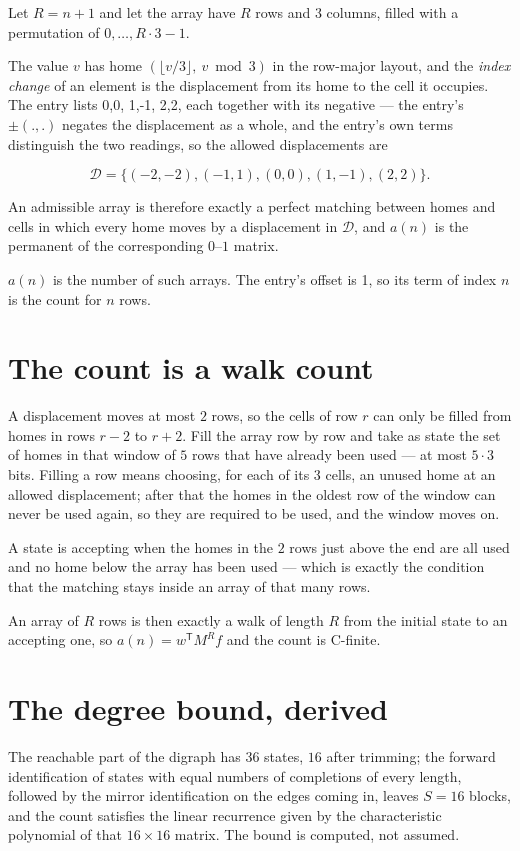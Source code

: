 \documentclass[11pt]{article}
\theoremstyle{definition}
\begin{document}
Let $R = n + 1$ and let the array have $R$ rows and $3$ columns, filled with a permutation of $0,\dots,R\cdot3-1$.

The value $v$ has home $(\lfloor v/3\rfloor,\ v \bmod 3)$ in the row-major layout, and the {\itshape index change} of an element is the displacement from its home to the cell it occupies. The entry lists 0,0, 1,-1, 2,2, each together with its negative --- the entry's $\pm(.,.)$ negates the displacement as a whole, and the entry's own terms distinguish the two readings, so the allowed displacements are

\[\mathcal{D} = \{(-2,-2), (-1,1), (0,0), (1,-1), (2,2)\}.\]

An admissible array is therefore exactly a perfect matching between homes and cells in which every home moves by a displacement in $\mathcal{D}$, and $a(n)$ is the permanent of the corresponding $0$--$1$ matrix.

$a(n)$ is the number of such arrays. The entry's offset is 1, so its term of index $n$ is the count for $n$ rows.

\section{The count is a walk count}

A displacement moves at most $2$ rows, so the cells of row $r$ can only be filled from homes in rows $r-2$ to $r+2$. Fill the array row by row and take as state the set of homes in that window of $5$ rows that have already been used --- at most $5\cdot3$ bits. Filling a row means choosing, for each of its $3$ cells, an unused home at an allowed displacement; after that the homes in the oldest row of the window can never be used again, so they are required to be used, and the window moves on.

A state is accepting when the homes in the $2$ rows just above the end are all used and no home below the array has been used --- which is exactly the condition that the matching stays inside an array of that many rows.

An array of $R$ rows is then exactly a walk of length $R$ from the initial state to an accepting one, so $a(n) = w^{\mathsf T}M^{R}f$ and the count is C-finite.

\section{The degree bound, derived}

The reachable part of the digraph has $36$ states, $16$ after trimming; the forward identification of states with equal numbers of completions of every length, followed by the mirror identification on the edges coming in, leaves $S = 16$ blocks, and the count satisfies the linear recurrence given by the characteristic polynomial of that $16\times16$ matrix. The bound is computed, not assumed.
\end{document}
